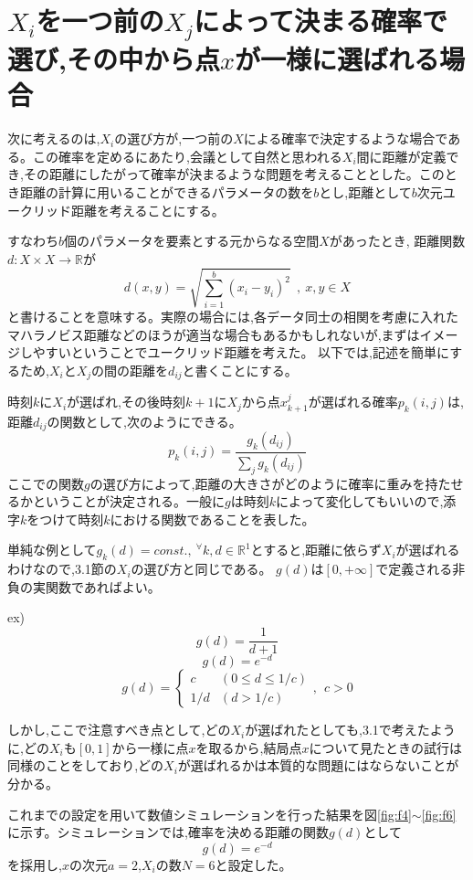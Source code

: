 \section{$X_{i}$を一つ前の$X_{j}$によって決まる確率で選び,その中から点$x$が一様に選ばれる場合}

次に考えるのは,$X_{i}$の選び方が,一つ前の$X$による確率で決定するような場合である。この確率を定めるにあたり,会議として自然と思われる$X_{i}$間に距離が定義でき,その距離にしたがって確率が決まるような問題を考えることとした。このとき距離の計算に用いることができるパラメータの数を$b$とし,距離として$b$次元ユークリッド距離を考えることにする。

すなわち$b$個のパラメータを要素とする元からなる空間$X$があったとき,
距離関数$d: X \times X \rightarrow \mathbb{R}$が
\[d(x, y) = \sqrt{\sum_{i=1}^{b}(x_{i}-y_{i})^{2}}\ \ ,\ x,y\in X\]
と書けることを意味する。実際の場合には,各データ同士の相関を考慮に入れたマハラノビス距離などのほうが適当な場合もあるかもしれないが,まずはイメージしやすいということでユークリッド距離を考えた。
以下では,記述を簡単にするため,$X_{i}$と$X_{j}$の間の距離を$d_{ij}$と書くことにする。

時刻$k$に$X_{i}$が選ばれ,その後時刻$k+1$に$X_{j}$から点$x_{k+1}^{j}$が選ばれる確率$p_{k}(i,j)$は,距離$d_{ij}$の関数として,次のようにできる。
\[p_{k}(i,j) = \frac{g_{k}(d_{ij})}{\sum_{j} g_{k}(d_{ij})}\]
ここでの関数$g$の選び方によって,距離の大きさがどのように確率に重みを持たせるかということが決定される。一般に$g$は時刻$k$によって変化してもいいので,添字$k$をつけて時刻$k$における関数であることを表した。

単純な例として$g_{k}(d) = const.,\ ^{\forall}k, d\in \mathbb{R}^{1}$とすると,距離に依らず$X_{i}$が選ばれるわけなので,3.1節の$X_{i}$の選び方と同じである。
$g(d)$は$[0, +\infty]$で定義される非負の実関数であればよい。

ex)
\[g(d) = \frac{1}{d+1}\]
\[g(d) = e^{-d}\]
\[g(d) = \left\{ \begin{array}{ll} c & (0\le d \le 1/c) \nonumber\\
1/d & (d>1/c)\end{array}\right., \ \ c>0\]

しかし,ここで注意すべき点として,どの$X_{i}$が選ばれたとしても,3.1で考えたように,どの$X_{i}$も$[0,1]$から一様に点$x$を取るから,結局点$x$について見たときの試行は同様のことをしており,どの$X_{i}$が選ばれるかは本質的な問題にはならないことが分かる。

これまでの設定を用いて数値シミュレーションを行った結果を図\ref{fig:f4}$\sim$\ref{fig:f6}に示す。シミュレーションでは,確率を決める距離の関数$g(d)$として
\[g(d) = e^{-d}\]
を採用し,$x$の次元$a=2$,$X_{i}$の数$N=6$と設定した。

